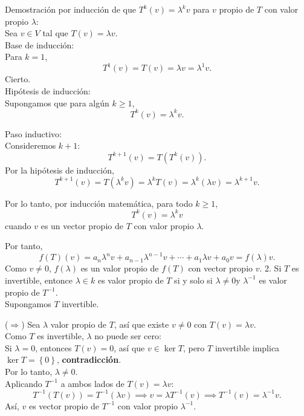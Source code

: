\documentclass{article}
\theoremstyle{nonumberplain}
\begin{document}
\begin{mdframed}
    Demostración por inducción de que \( T^k(v) = \lambda^k v \) para \( v \) propio de \( T \) con valor propio \( \lambda \): \\

Sea \( v \in V \) tal que \( T(v) = \lambda v \). \\

Base de inducción:   \\
Para \( k = 1 \),
\[
T^1(v) = T(v) = \lambda v = \lambda^1 v.
\]
Cierto. \\

Hipótesis de inducción:   \\
Supongamos que para algún \( k \geq 1 \),
\[
T^k(v) = \lambda^k v.
\]

Paso inductivo:   \\
Consideremos \( k+1 \):
\[
T^{k+1}(v) = T(T^k(v)).
\]
Por la hipótesis de inducción,
\[
T^{k+1}(v) = T(\lambda^k v) = \lambda^k T(v) = \lambda^k (\lambda v) = \lambda^{k+1} v.
\]

Por lo tanto, por inducción matemática, para todo \( k \geq 1 \),
\[
\boxed{T^k(v) = \lambda^k v}
\]
cuando \( v \) es un vector propio de \( T \) con valor propio \( \lambda \).
\end{mdframed}

Por tanto,
\[
f(T)(v) = a_n \lambda^n v + a_{n-1} \lambda^{n-1} v + \cdots + a_1 \lambda v + a_0 v = f(\lambda) v.
\]
Como \( v \neq 0 \), \( f(\lambda) \) es un valor propio de \( f(T) \) con vector propio \( v \).
2. Si \( T \) es invertible, entonce \( \lambda \in k \) es valor propio de \( T \) si y solo si \( \lambda \neq 0 \mathrm{y} \) \( \lambda^{-1} \) es valor propio de \( T^{-1} \). \\
Supongamos \( T \) invertible.

(\( \Rightarrow \))  
Sea \( \lambda \) valor propio de \( T \), así que existe \( v \neq 0 \) con \( T(v) = \lambda v \). \\

Como \( T \) es invertible, \( \lambda \) no puede ser cero:   \\
Si \( \lambda = 0 \), entonces \( T(v) = 0 \), así que \( v \in \ker T \), pero \( T \) invertible implica \( \ker T = \left\{ 0 \right\} \), \textbf{contradicción}.   \\
Por lo tanto, \( \lambda \neq 0 \). \\

Aplicando \( T^{-1} \) a ambos lados de \( T(v) = \lambda v \):
\[
T^{-1}(T(v)) = T^{-1}(\lambda v) \implies v = \lambda T^{-1}(v) \implies T^{-1}(v) = \lambda^{-1} v.
\]
Así, \( v \) es vector propio de \( T^{-1} \) con valor propio \( \lambda^{-1} \). \\
\end{document}

